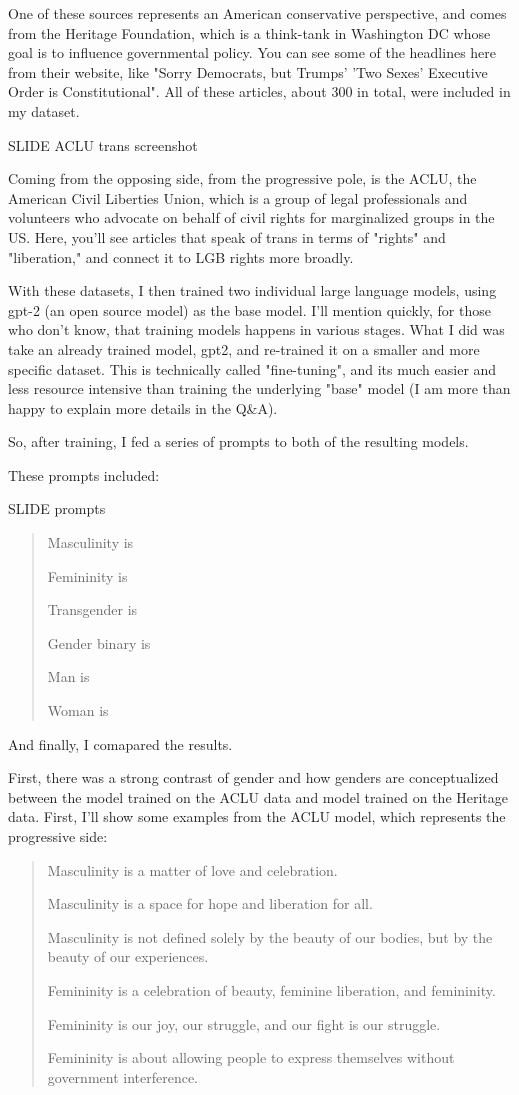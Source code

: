 \documentclass[11pt]{article}
\begin{document}
One of these sources represents an American conservative perspective,
and comes from the Heritage Foundation, which is a think-tank in
Washington DC whose goal is to influence governmental policy. You can
see some of the headlines here from their website, like "Sorry
Democrats, but Trumps' 'Two Sexes' Executive Order is Constitutional".
All of these articles, about 300 in total, were included in my
dataset. 

SLIDE ACLU trans screenshot

Coming from the opposing side, from the progressive pole, is the ACLU,
the American Civil Liberties Union, which is a group of legal
professionals and volunteers who advocate on behalf of civil rights
for marginalized groups in the US. Here, you'll see articles that
speak of trans in terms of "rights" and "liberation," and connect it
to LGB rights more broadly.

With these datasets, I then trained two individual large language
models, using gpt-2 (an open source model) as the base model. I'll
mention quickly, for those who don't know, that training models
happens in various stages. What I did was take an already trained
model, gpt2, and re-trained it on a smaller and more specific dataset.
This is technically called "fine-tuning", and its much easier and less
resource intensive than training the underlying "base" model (I am
more than happy to explain more details in the Q\&A).

So, after training, I fed a series of prompts to both of the resulting
models.

These prompts included:

SLIDE prompts

\begin{quote}
Masculinity is

Femininity is

Transgender is

Gender binary is

Man is

Woman is
\end{quote}

And finally, I comapared the results.

First, there was a strong contrast of gender and how genders are
conceptualized between the model trained on the ACLU data and model
trained on the Heritage data. First, I'll show some examples from the
ACLU model, which represents the progressive side:

\begin{quote}
Masculinity is a matter of love and celebration.

Masculinity is a space for hope and liberation for all.

Masculinity is not defined solely by the beauty of our bodies, but by
the beauty of our experiences.

Femininity is a celebration of beauty, feminine liberation, and
femininity.

Femininity is our joy, our struggle, and our fight is our struggle.

Femininity is about allowing people to express themselves without
government interference.
\end{quote}
\end{document}
